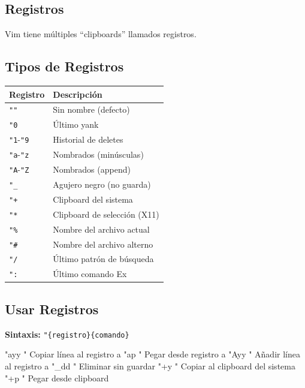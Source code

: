 \documentclass[
  doc,
  floatsintext,
  longtable,
  a4paper,
  nolmodern,
  notxfonts,
  notimes,
  12pt,
  colorlinks=true,linkcolor=blue,citecolor=blue,urlcolor=blue]{apa7}
\newenvironment{Shaded}{\begin{snugshade}}{\end{snugshade}}
\newcommand{\NormalTok}[1]{\textcolor[rgb]{0.00,0.23,0.31}{#1}}
\newcounter{none} %
\begin{document}
\subsection{Registros}\label{registros}

Vim tiene múltiples ``clipboards'' llamados registros.

\subsection{Tipos de Registros}\label{tipos-de-registros}

{\def\LTcaptype{none} %
\begin{longtable}[]{@{}ll@{}}
\toprule\noalign{}
Registro & Descripción \\
\midrule\noalign{}
\endhead
\bottomrule\noalign{}
\endlastfoot
\texttt{""} & Sin nombre (defecto) \\
\texttt{"0} & Último yank \\
\texttt{"1}-\texttt{"9} & Historial de deletes \\
\texttt{"a}-\texttt{"z} & Nombrados (minúsculas) \\
\texttt{"A}-\texttt{"Z} & Nombrados (append) \\
\texttt{"\_} & Agujero negro (no guarda) \\
\texttt{"+} & Clipboard del sistema \\
\texttt{"*} & Clipboard de selección (X11) \\
\texttt{"\%} & Nombre del archivo actual \\
\texttt{"\#} & Nombre del archivo alterno \\
\texttt{"/} & Último patrón de búsqueda \\
\texttt{":} & Último comando Ex \\
\end{longtable}
}

\subsection{Usar Registros}\label{usar-registros}

\textbf{Sintaxis:} \texttt{"\{registro\}\{comando\}}

\begin{Shaded}
\begin{Highlighting}[]
\NormalTok{"ayy       " Copiar línea al registro a}
\NormalTok{"ap        " Pegar desde registro a}
\NormalTok{"Ayy       " Añadir línea al registro a}
\NormalTok{"\_dd       " Eliminar sin guardar}
\NormalTok{"+y        " Copiar al clipboard del sistema}
\NormalTok{"+p        " Pegar desde clipboard}
\end{Highlighting}
\end{Shaded}
\end{document}
